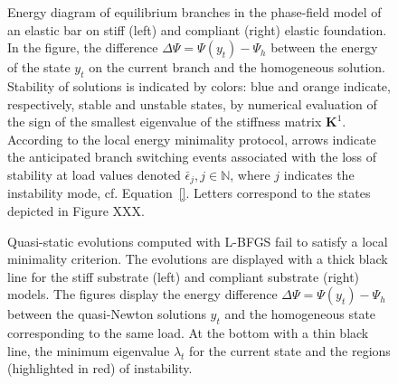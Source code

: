 \begin{figure}[htbp]
    \centering
    \caption{
        Energy diagram of equilibrium branches in the phase-field model of an elastic bar on stiff (left) and compliant (right) elastic foundation. In the figure, the difference $\Delta \Psi = \Psi(y_t)-\Psi_h$ between the energy of the state $y_t$ on the current branch and the homogeneous solution. Stability of solutions is indicated by colors: blue and orange indicate, respectively, stable and unstable states, by numerical evaluation of the sign of the smallest eigenvalue of the stiffness matrix $\mathbf{K}^1$. According to the local energy minimality protocol, arrows indicate the anticipated branch switching events associated with the loss of stability at load values denoted $\bar \epsilon_j, j \in \mathbb N$, where $j$ indicates the instability mode, cf. Equation~\eqref{}. Letters correspond to the states depicted in Figure XXX.%
    }
    \label{fig:}
\end{figure}

\begin{figure}[htbp]
    \centering
    \caption{Quasi-static evolutions computed with L-BFGS fail to satisfy a local minimality criterion. The evolutions are displayed with a thick black line for the stiff substrate (left) and compliant substrate (right) models. The figures display the energy difference $\Delta \Psi = \Psi(y_t)-\Psi_h$ between the quasi-Newton solutions $y_t$ and the homogeneous state corresponding to the same load. At the bottom with a thin black line, the minimum eigenvalue $\lambda_t$ for the current state and the regions (highlighted in red) of instability.}
    \label{fig:}
\end{figure}



